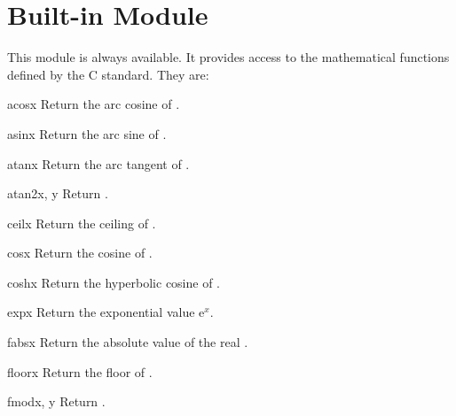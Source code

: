 \section{Built-in Module }
\label{module-math}

\renewcommand{\indexsubitem}{(in module math)}
This module is always available.
It provides access to the mathematical functions defined by the C
standard.
They are:

\begin{funcdesc}{acos}{x}
Return the arc cosine of .
\end{funcdesc}

\begin{funcdesc}{asin}{x}
Return the arc sine of .
\end{funcdesc}

\begin{funcdesc}{atan}{x}
Return the arc tangent of .
\end{funcdesc}

\begin{funcdesc}{atan2}{x, y}
Return .
\end{funcdesc}

\begin{funcdesc}{ceil}{x}
Return the ceiling of .
\end{funcdesc}

\begin{funcdesc}{cos}{x}
Return the cosine of .
\end{funcdesc}

\begin{funcdesc}{cosh}{x}
Return the hyperbolic cosine of .
\end{funcdesc}

\begin{funcdesc}{exp}{x}
Return the exponential value $\mbox{e}^x$.
\end{funcdesc}

\begin{funcdesc}{fabs}{x}
Return the absolute value of the real .
\end{funcdesc}

\begin{funcdesc}{floor}{x}
Return the floor of .
\end{funcdesc}

\begin{funcdesc}{fmod}{x, y}
Return .
\end{funcdesc}

